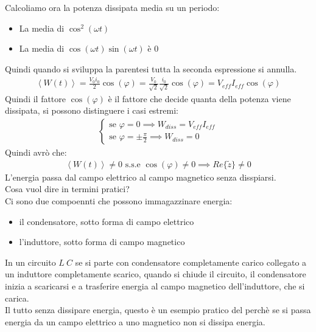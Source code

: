 \documentclass[a4paper, oneside]{article}
\begin{document}
Calcoliamo ora la potenza dissipata media su un periodo:
\begin{itemize}
    \item La media di $\cos^2(\omega t)$
    \item La media di $\cos(\omega t) \sin(\omega t)$ è $0$
\end{itemize}
Quindi quando si sviluppa la parentesi tutta la seconda espressione si annulla.
\begin{gather*}
    \left\langle W(t) \right\rangle = \frac{V_0 i_0}{2} \cos(\varphi) = \frac{V_0}{\sqrt{2}} \frac{i_0}{\sqrt{2}} \cos(\varphi) = V_{eff} I_{eff} \cos(\varphi)
\end{gather*}
Quindi il fattore $\cos(\varphi)$ è il fattore che decide quanta della potenza viene dissipata, si possono distinguere i casi estremi:
\begin{gather*}
    \begin{cases}
        \text{se } \varphi = 0 \implies W_{diss} = V_{eff} I_{eff}\\
        \text{se } \varphi = \pm \frac{\pi}{2} \implies W_{diss} = 0
    \end{cases}
\end{gather*}
Quindi avrò che:
\begin{gather*}
    \left\langle W(t) \right\rangle \neq 0 \text{ s.s.e } \cos(\varphi) \neq 0 \implies Re\{ \widetilde{z} \} \neq 0
\end{gather*}
L'energia passa dal campo elettrico al campo magnetico senza disspiarsi.\\
Cosa vuol dire in termini pratici?\\
Ci sono due compoennti che possono immagazzinare energia:
\begin{itemize}
    \item il condensatore, sotto forma di campo elettrico
    \item l'induttore, sotto forma di campo magnetico
\end{itemize}
In un circuito $L \ C$ se si parte con condensatore completamente carico collegato a un induttore completamente scarico, quando si chiude il circuito, il condensatore inizia a scaricarsi e a trasferire energia al campo magnetico dell'induttore, che si carica.\\
Il tutto senza dissipare energia, questo è un esempio pratico del perchè se si passa energia da un campo elettrico a uno magnetico non si dissipa energia.
\end{document}
